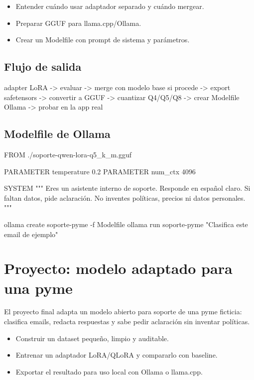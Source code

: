 \documentclass[11pt,a4paper]{book}
\begin{document}
\begin{itemize}\item Entender cuándo usar adaptador separado y cuándo mergear.\end{itemize}
\begin{itemize}\item Preparar GGUF para llama.cpp/Ollama.\end{itemize}
\begin{itemize}\item Crear un Modelfile con prompt de sistema y parámetros.\end{itemize}
\section{Flujo de salida}
\begin{codebox}
adapter LoRA
  -> evaluar
  -> merge con modelo base si procede
  -> export safetensors
  -> convertir a GGUF
  -> cuantizar Q4/Q5/Q8
  -> crear Modelfile Ollama
  -> probar en la app real
\end{codebox}
\section{Modelfile de Ollama}
\begin{codebox}
FROM ./soporte-qwen-lora-q5_k_m.gguf

PARAMETER temperature 0.2
PARAMETER num_ctx 4096

SYSTEM """
Eres un asistente interno de soporte.
Responde en español claro.
Si faltan datos, pide aclaración.
No inventes políticas, precios ni datos personales.
"""
\end{codebox}
\begin{codebox}
ollama create soporte-pyme -f Modelfile
ollama run soporte-pyme "Clasifica este email de ejemplo"
\end{codebox}
\chapter{Proyecto: modelo adaptado para una pyme}
El proyecto final adapta un modelo abierto para soporte de una pyme ficticia: clasifica emails, redacta respuestas y sabe pedir aclaración sin inventar políticas.

\begin{itemize}\item Construir un dataset pequeño, limpio y auditable.\end{itemize}
\begin{itemize}\item Entrenar un adaptador LoRA/QLoRA y compararlo con baseline.\end{itemize}
\begin{itemize}\item Exportar el resultado para uso local con Ollama o llama.cpp.\end{itemize}
\end{document}
